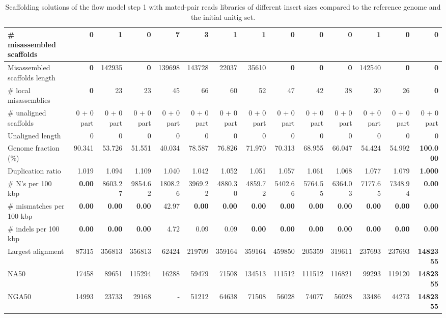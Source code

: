 \documentclass[12pt]{article}
\begin{document}
\begin{table}[ht]
\begin{center}
{\begin{tabular}{|l*{13}{|r}|}
\# misassembled scaffolds & {\bf 0} & 1 & {\bf 0} & 7 & 3 & 1 & 1 & {\bf 0} & {\bf 0} & {\bf 0} & 1 & {\bf 0} & {\bf 0} \\ \hline
Misassembled scaffolds length & {\bf 0} & 142935 & {\bf 0} & 139698 & 143728 & 22037 & 35610 & {\bf 0} & {\bf 0} & {\bf 0} & 142540 & {\bf 0} & {\bf 0} \\ \hline
\# local misassemblies & {\bf 0} & 23 & 23 & 45 & 66 & 60 & 52 & 47 & 42 & 38 & 30 & 26 & {\bf 0} \\ \hline
\# unaligned scaffolds & 0 + 0 part & 0 + 0 part & 0 + 0 part & 0 + 0 part & 0 + 0 part & 0 + 0 part & 0 + 0 part & 0 + 0 part & 0 + 0 part & 0 + 0 part & 0 + 0 part & 0 + 0 part & 0 + 0 part \\ \hline
Unaligned length & 0 & 0 & 0 & 0 & 0 & 0 & 0 & 0 & 0 & 0 & 0 & 0 & 0 \\ \hline
Genome fraction (\%) & 90.341 & 53.726 & 51.551 & 40.034 & 78.587 & 76.826 & 71.970 & 70.313 & 68.955 & 66.047 & 54.424 & 54.992 & {\bf 100.000} \\ \hline
Duplication ratio & 1.019 & 1.094 & 1.109 & 1.040 & 1.042 & 1.052 & 1.051 & 1.057 & 1.061 & 1.068 & 1.077 & 1.079 & {\bf 1.000} \\ \hline
\# N's per 100 kbp & {\bf 0.00} & 8603.27 & 9854.62 & 1808.26 & 3969.22 & 4880.30 & 4859.72 & 5402.66 & 5764.55 & 6364.03 & 7177.65 & 7348.94 & {\bf 0.00} \\ \hline
\# mismatches per 100 kbp & {\bf 0.00} & {\bf 0.00} & {\bf 0.00} & 42.97 & {\bf 0.00} & {\bf 0.00} & {\bf 0.00} & {\bf 0.00} & {\bf 0.00} & {\bf 0.00} & {\bf 0.00} & {\bf 0.00} & {\bf 0.00} \\ \hline
\# indels per 100 kbp & {\bf 0.00} & {\bf 0.00} & {\bf 0.00} & 4.72 & 0.09 & 0.09 & {\bf 0.00} & {\bf 0.00} & {\bf 0.00} & {\bf 0.00} & {\bf 0.00} & {\bf 0.00} & {\bf 0.00} \\ \hline
Largest alignment & 87315 & 356813 & 356813 & 62424 & 219709 & 359164 & 359164 & 459850 & 205359 & 319611 & 237693 & 237693 & {\bf 1482355} \\ \hline
NA50 & 17458 & 89651 & 115294 & 16288 & 59479 & 71508 & 134513 & 111512 & 111512 & 116821 & 99293 & 119120 & {\bf 1482355} \\ \hline
NGA50 & 14993 & 23733 & 29168 & - & 51212 & 64638 & 71508 & 56028 & 74077 & 56028 & 33486 & 44273 & {\bf 1482355} \\ \hline
\end{tabular}
}
\end{center}
\caption{Scaffolding solutions of the flow model step 1 with mated-pair reads libraries of different insert sizes compared to the reference genome and the initial unitig set.}

\end{table}
\end{document}
